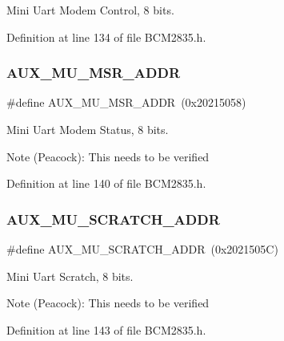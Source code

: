 Mini Uart Modem Control, 8 bits. 



Definition at line 134 of file B\+C\+M2835.\+h.

\mbox{\label{group__UART_gad7e37af940a9ff96e6aba9d307b926be}} 
\subsubsection{\texorpdfstring{A\+U\+X\+\_\+\+M\+U\+\_\+\+M\+S\+R\+\_\+\+A\+D\+DR}{AUX\_MU\_MSR\_ADDR}}
{\footnotesize\ttfamily \#define A\+U\+X\+\_\+\+M\+U\+\_\+\+M\+S\+R\+\_\+\+A\+D\+DR~(0x20215058)}



Mini Uart Modem Status, 8 bits. 

\begin{DoxyNote}{Note}
(Peacock)\+: This needs to be verified 
\end{DoxyNote}


Definition at line 140 of file B\+C\+M2835.\+h.

\mbox{\label{group__UART_ga34eb1e827236c566957962b30be74496}} 
\subsubsection{\texorpdfstring{A\+U\+X\+\_\+\+M\+U\+\_\+\+S\+C\+R\+A\+T\+C\+H\+\_\+\+A\+D\+DR}{AUX\_MU\_SCRATCH\_ADDR}}
{\footnotesize\ttfamily \#define A\+U\+X\+\_\+\+M\+U\+\_\+\+S\+C\+R\+A\+T\+C\+H\+\_\+\+A\+D\+DR~(0x2021505\+C)}



Mini Uart Scratch, 8 bits. 

\begin{DoxyNote}{Note}
(Peacock)\+: This needs to be verified 
\end{DoxyNote}


Definition at line 143 of file B\+C\+M2835.\+h.

